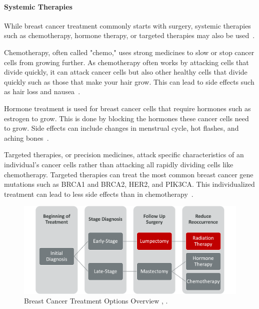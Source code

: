 \paragraph*{Systemic Therapies\label{sec:introduction:breastcancer:currenttreatmentoptions:systemictherapies}}
While breast cancer treatment commonly starts with surgery, systemic therapies such as chemotherapy, hormone therapy, or targeted therapies may also be used~\cite{RefWorks:RefID:37-memorialsurgery}.

Chemotherapy, often called "chemo," uses strong medicines to slow or stop cancer cells from growing further. As chemotherapy often works by attacking cells that divide quickly, it can attack cancer cells but also other healthy cells that divide quickly such as those that make your hair grow. This can lead to side effects such as hair loss and nausea~\cite{RefWorks:RefID:37-memorialsurgery}.

Hormone treatment is used for breast cancer cells that require hormones such as estrogen to grow. This is done by blocking the hormones these cancer cells need to grow. Side effects can include changes in menstrual cycle, hot flashes, and aching bones~\cite{RefWorks:RefID:37-memorialsurgery}.

Targeted therapies, or precision medicines, attack specific characteristics of an individual's cancer cells rather than attacking all rapidly dividing cells like chemotherapy. Targeted therapies can treat the most common breast cancer gene mutations such as BRCA1 and BRCA2, HER2, and PIK3CA. This individualized treatment can lead to less side effects than in chemotherapy~\cite{RefWorks:RefID:37-memorialsurgery}.

\begin{figure}[h!]
        \centering
        \includegraphics[width=\textwidth]{../figs/introduction/breast_cancer_treatment_process_flowchart.png}
        \caption{Breast Cancer Treatment Options Overview \cite{RefWorks:RefID:37-memorialsurgery}, \cite{RefWorks:RefID:370-einsteinisaac}.}
        \label{fig:introduction:breast_cancer_treatment_options_overview}
\end{figure}

